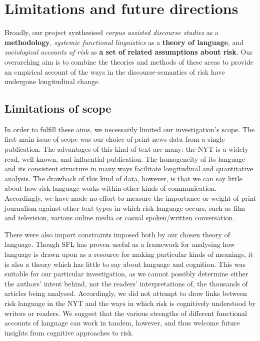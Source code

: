 
\chapter{Limitations and future directions}


Broadly, our project synthesised \emph{corpus assisted discourse studies} as a \textbf{methodology}, \emph{systemic functional linguistics} as a \textbf{theory of language}, and \emph{sociological accounts of risk} as \textbf{a set of related assumptions about risk}. Our overarching aim is to combine the theories and methods of these areas to provide an empirical account of the ways in the discourse-semantics of risk have undergone longitudinal change.

\section{Limitations of scope}

In order to fulfill these aims, we necessarily limited our investigation's scope. The first main issue of scope was our choice of print news data from a single publication. The advantages of this kind of text are many: the NYT is a widely read, well-known, and influential publication. The homogeneity of its language and its consistent structure in many ways facilitate longitudinal and quantitative analysis. The drawback of this kind of data, however, is that we can say little about how risk language works within other kinds of communication. Accordingly, we have made no effort to measure the importance or weight of print journalism against other text types in which risk language occurs, such as film and television, various online media or casual spoken\slash written conversation.

There were also import constraints imposed both by our chosen theory of language. Though SFL has proven useful as a framework for analysing how language is drawn upon as a resource for making particular kinds of meanings, it is also a theory which has little to say about language and cognition. This was suitable for our particular investigation, as we cannot possibly determine either the authors' intent behind, nor the readers' interpretations of, the thousands of articles being analysed. Accordingly, we did not attempt to draw links between risk language in the NYT and the ways in which risk is cognitively understood by writers or readers. We suggest that the various strengths of different functional accounts of language can work in tandem, however, and thus welcome future insights from cognitive approaches to risk.

